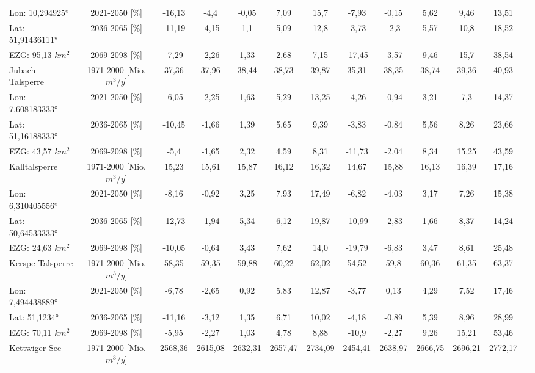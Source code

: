 \begin{longtable}{@{\extracolsep{\fill}}lc|ccccc||cccccc}
\cline{2-13} 
Lon: 10,294925° & 2021-2050 [\%]  & -16,13 & -4,4 & -0,05 & 7,09 & 15,7 & -7,93 & -0,15 & 5,62 & 9,46 & 13,51 & \\ 
Lat: 51,91436111° & 2036-2065 [\%]  & -11,19 & -4,15 & 1,1 & 5,09 & 12,8 & -3,73 & -2,3 & 5,57 & 10,8 & 18,52 & \\ 
EZG: 95,13 $km^2$ & 2069-2098 [\%]  & -7,29 & -2,26 & 1,33 & 2,68 & 7,15 & -17,45 & -3,57 & 9,46 & 15,7 & 38,54 & \\ 
\hline 
Jubach-Talsperre & 1971-2000 [Mio. $m^3/y$]  & 37,36 & 37,96 & 38,44 & 38,73 & 39,87 & 35,31 & 38,35 & 38,74 & 39,36 & 40,93 & \\ 
\cline{2-13} 
Lon: 7,608183333° & 2021-2050 [\%]  & -6,05 & -2,25 & 1,63 & 5,29 & 13,25 & -4,26 & -0,94 & 3,21 & 7,3 & 14,37 & \\ 
Lat: 51,16188333° & 2036-2065 [\%]  & -10,45 & -1,66 & 1,39 & 5,65 & 9,39 & -3,83 & -0,84 & 5,56 & 8,26 & 23,66 & \\ 
EZG: 43,57 $km^2$ & 2069-2098 [\%]  & -5,4 & -1,65 & 2,32 & 4,59 & 8,31 & -11,73 & -2,04 & 8,34 & 15,25 & 43,59 & \\ 
\hline 
Kalltalsperre & 1971-2000 [Mio. $m^3/y$]  & 15,23 & 15,61 & 15,87 & 16,12 & 16,32 & 14,67 & 15,88 & 16,13 & 16,39 & 17,16 & \\ 
\cline{2-13} 
Lon: 6,310405556° & 2021-2050 [\%]  & -8,16 & -0,92 & 3,25 & 7,93 & 17,49 & -6,82 & -4,03 & 3,17 & 7,26 & 15,38 & \\ 
Lat: 50,64533333° & 2036-2065 [\%]  & -12,73 & -1,94 & 5,34 & 6,12 & 19,87 & -10,99 & -2,83 & 1,66 & 8,37 & 14,24 & \\ 
EZG: 24,63 $km^2$ & 2069-2098 [\%]  & -10,05 & -0,64 & 3,43 & 7,62 & 14,0 & -19,79 & -6,83 & 3,47 & 8,61 & 25,48 & \\ 
\hline 
Kerspe-Talsperre & 1971-2000 [Mio. $m^3/y$]  & 58,35 & 59,35 & 59,88 & 60,22 & 62,02 & 54,52 & 59,8 & 60,36 & 61,35 & 63,37 & \\ 
\cline{2-13} 
Lon: 7,494438889° & 2021-2050 [\%]  & -6,78 & -2,65 & 0,92 & 5,83 & 12,87 & -3,77 & 0,13 & 4,29 & 7,52 & 17,46 & \\ 
Lat: 51,1234° & 2036-2065 [\%]  & -11,16 & -3,12 & 1,35 & 6,71 & 10,02 & -4,18 & -0,89 & 5,39 & 8,96 & 28,99 & \\ 
EZG: 70,11 $km^2$ & 2069-2098 [\%]  & -5,95 & -2,27 & 1,03 & 4,78 & 8,88 & -10,9 & -2,27 & 9,26 & 15,21 & 53,46 & \\ 
\hline 
Kettwiger See & 1971-2000 [Mio. $m^3/y$]  & 2568,36 & 2615,08 & 2632,31 & 2657,47 & 2734,09 & 2454,41 & 2638,97 & 2666,75 & 2696,21 & 2772,17 & \\ 

\end{longtable}
